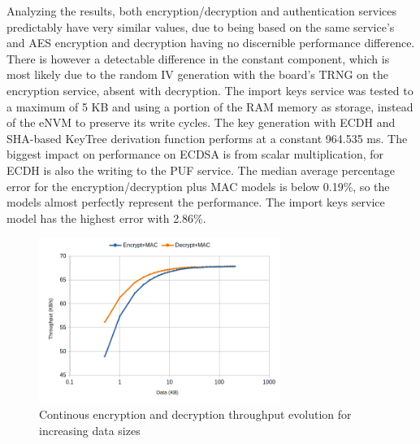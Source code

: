 Analyzing the results, both encryption/decryption and authentication services predictably have very similar values, due to being based on the same service's and \ac{AES} encryption and decryption having no discernible performance difference.
There is however a detectable difference in the constant component, which is most likely due to the random \ac{IV} generation with the board's \ac{TRNG} on the encryption service, absent with decryption.
The import keys service was tested to a maximum of 5 KB and using a portion of the RAM memory as storage, instead of the eNVM to preserve its write cycles.
The key generation with \ac{ECDH} and \ac{SHA}-based KeyTree derivation function performs at a constant 964.535 ms.
The biggest impact on performance on \ac{ECDSA} is from scalar multiplication, for \ac{ECDH} is also the writing to the \ac{PUF} service.
The median average percentage error for the encryption/decryption plus MAC models is below 0.19\%, so the models almost perfectly represent the performance. The import keys service model has the highest error with 2.86\%.

\begin{figure}[h!]
	\centering
	\includegraphics[width=0.7\textwidth]{./Images/services-tput.png}
	\caption{Continous encryption and decryption throughput evolution for increasing data sizes}
	\label{fig:performance:services-tput}
\end{figure}

